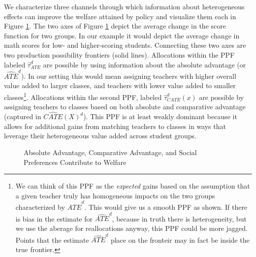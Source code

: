 \documentclass[12pt]{article}
\theoremstyle{definition}
\theoremstyle{definition}
\theoremstyle{definition}
\theoremstyle{definition}
\begin{document}
We characterize three channels through which information about heterogeneous effects can improve the welfare attained by policy and visualize them each in Figure \ref{fig:theory}. The two axes of Figure \ref{fig:theory} depict the average change in the score function for two groups. In our example it would depict the average change in math scores for low- and higher-scoring students. Connecting these two axes are two production possibility frontiers (solid lines). Allocations within the PPF labeled $\hat{\tau}^d_{ATE}$ are possible by using information about the absolute advantage (or $\widehat{ATE}^d$). In our setting this would mean assigning teachers with higher overall value added to larger classes, and teachers with lower value added to smaller classes\footnote{ We can think of this PPF as the \textit{expected} gains based on the assumption that a given teacher truly has homogeneous impacts on the two groups characterized by $\widehat{ATE}^d$. This would give us a smooth PPF as shown. If there is bias in the estimate for $\widehat{ATE}^d$, because in truth there is heterogeneity, but we use the aberage for reallocations anyway, this PPF could be more jagged. Points that the estimate $\widehat{ATE}^d$ place on the fronteir may in fact be inside the true frontier. }.  Allocations within the second PPF, labeled $\hat{\tau}^d_{CATE}(x)$ are possible by assigning teachers to classes based on both absolute and comparative advantage (captured in $\widehat{CATE}(X)^d$). This PPF is at least weakly dominant because it allows for additional gains from matching teachers to classes in ways that leverage their heterogeneous value added across student groups.


\begin{figure}[htpb]
\label{fig_theory_ppf}
    \centering
    \resizebox{!}{.46\textwidth}{
    \begin{tikzpicture}[scale=1]
	
    \end{tikzpicture}}
    \caption{Absolute Advantage, Comparative Advantage, and Social Preferences Contribute to Welfare}
    \label{fig:theory}
\end{figure}
\end{document}
